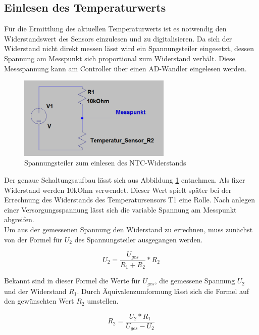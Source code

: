 \subsection{Einlesen des Temperaturwerts}
Für die Ermittlung des aktuellen Temperaturwerts ist es notwendig den Widerstandswert des Sensors einzulesen und zu digitalisieren. Da sich der Widerstand nicht direkt messen lässt wird ein Spannungsteiler eingesetzt, dessen Spannung am Messpunkt sich proportional zum Widerstand verhält. Diese Messspannung kann am Controller über einen AD-Wandler eingelesen werden.

\begin{figure}[ht]
\centering
\includegraphics[width=0.65\textwidth]{sensor/temperature_circuit.PNG}
\caption{Spannungsteiler zum einlesen des NTC-Widerstands}
\label{img:temperature_circuit}
\end{figure}

Der genaue Schaltungsaufbau lässt sich aus Abbildung \ref{img:temperature_circuit} entnehmen. Als fixer Widerstand werden 10kOhm verwendet. Dieser Wert spielt später bei der Errechnung des Widerstands des Temperatursensors T1 eine Rolle. Nach anlegen einer Versorgungsspannung lässt sich die variable Spannung am Messpunkt abgreifen. \\
\label{lbl:temp_equation}
Um aus der gemessenen Spannung den Widerstand zu errechnen, muss zunächst von der Formel für $U_{2}$ des Spannungsteiler ausgegangen werden.

\begin{equation}
U_{2} = \frac{U_{ges}}{R_{1} + R_{2}} * R_{2}
\end{equation}

Bekannt sind in dieser Formel die Werte für $U_{ges}$, die gemessene Spannung $U_{2}$ und der Widerstand $R_{1}$. Durch Äquivalenzumformung lässt sich die Formel auf den gewünschten Wert $R_{2}$ umstellen.

\begin{equation}
R_{2} = \frac{U_{2} * R_{1}}{U_{ges} - U_{2}}
\end{equation}

